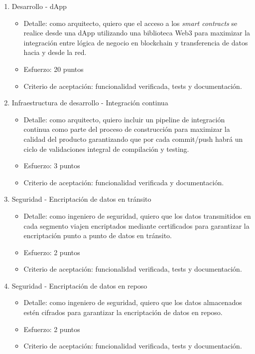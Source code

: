 \documentclass[
11pt, %
]{charter}
\begin{document}
\begin{enumerate}
	\item Desarrollo - dApp
	\begin{itemize}
		\item Detalle: como arquitecto, quiero que el acceso a los \textit{smart contracts} se realice desde una dApp utilizando una biblioteca Web3 para maximizar la integración entre lógica de negocio en blockchain y transferencia de datos hacia y desde la red.
		\item Esfuerzo: 20 puntos
		\item Criterio de aceptación: funcionalidad verificada, tests y documentación.
	\end{itemize}
	
	\vspace{2em}
	\item Infraestructura de desarrollo - Integración continua
	\begin{itemize}
		\item Detalle: como arquitecto, quiero incluir un pipeline de integración continua como parte del proceso de construcción para maximizar la calidad del producto garantizando que por cada commit/push habrá un ciclo de validaciones integral de compilación y testing.
		\item Esfuerzo: 3 puntos
		\item Criterio de aceptación: funcionalidad verificada y documentación.
	\end{itemize}

	\item Seguridad - Encriptación de datos en tránsito
	\begin{itemize}
		\item Detalle: como ingeniero de seguridad, quiero que los datos transmitidos en cada segmento viajen encriptados mediante certificados para garantizar la encriptación punto a punto de datos en tránsito.
		\item Esfuerzo: 2 puntos
		\item Criterio de aceptación: funcionalidad verificada, tests y documentación.
	\end{itemize}

\item Seguridad - Encriptación de datos en reposo
	\begin{itemize}
		\item Detalle: como ingeniero de seguridad, quiero que los datos almacenados estén cifrados para garantizar la encriptación de datos en reposo.
		\item Esfuerzo: 2 puntos
		\item Criterio de aceptación: funcionalidad verificada, tests y documentación.
	\end{itemize}


\end{enumerate}
\end{document}
